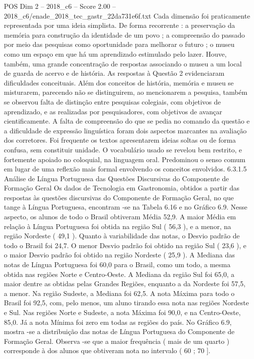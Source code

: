\begin{textsample}{POS Dim 2 – 2018\_c6 – Score 2.00 – 2018\_c6/enade\_2018\_tec\_gastr\_22da731e6f.txt}
Cada dimensão foi praticamente representada por uma ideia simplista.
De forma recorrente : a preservação da memória para construção da identidade de um povo ; a compreensão do passado por meio das pesquisas como oportunidade para melhorar o futuro ; o museu como um espaço em que há um aprendizado estimulado pelo lazer.
Houve, também, uma grande concentração de respostas associando o museu a um local de guarda de acervo e de história.
As respostas à Questão 2 evidenciaram dificuldades conceituais.
Além dos conceitos de história, memória e museu se misturarem, parecendo não se distinguirem, ao mencionarem a pesquisa, também se observou falta de distinção entre pesquisas colegiais, com objetivos de aprendizado, e as realizadas por pesquisadores, com objetivos de avançar cientificamente.
A falta de compreensão do que se pedia no comando da questão e a dificuldade de expressão linguística foram dois aspectos marcantes na avaliação dos corretores.
Foi frequente os textos apresentarem ideias soltas ou de forma confusa, sem constituir unidade.
O vocabulário usado se revelou bem restrito, e fortemente apoiado no coloquial, na linguagem oral.
Predominou o senso comum em lugar de uma reflexão mais formal envolvendo os conceitos envolvidos. 6.3.1.5 Análise de Língua Portuguesa das Questões Discursivas do Componente de Formação Geral Os dados de Tecnologia em Gastronomia, obtidos a partir das respostas às questões discursivas do Componente de Formação Geral, no que tange à Língua Portuguesa, encontram -se na Tabela 6.16 e no Gráfico 6.9.
Nesse aspecto, os alunos de todo o Brasil obtiveram Média 52,9.
A maior Média em relação à Língua Portuguesa foi obtida na região Sul ( 56,3 ), e a menor, na região Nordeste ( 49,1 ).
Quanto à variabilidade das notas, o Desvio padrão de todo o Brasil foi 24,7.
O menor Desvio padrão foi obtido na região Sul ( 23,6 ), e o maior Desvio padrão foi obtido na região Nordeste ( 25,9 ).
A Mediana das notas de Língua Portuguesa foi 60,0 para o Brasil, como um todo, a mesma obtida nas regiões Norte e Centro-Oeste.
A Mediana da região Sul foi 65,0, a maior dentre as obtidas pelas Grandes Regiões, enquanto a da Nordeste foi 57,5, a menor.
Na região Sudeste, a Mediana foi 62,5.
A nota Máxima para todo o Brasil foi 92,5, com, pelo menos, um aluno tirando essa nota nas regiões Nordeste e Sul.
Nas regiões Norte e Sudeste, a nota Máxima foi 90,0, e na Centro-Oeste, 85,0.
Já a nota Mínima foi zero em todas as regiões do país.
No Gráfico 6.9, mostra -se a distribuição das notas de Língua Portuguesa do Componente de Formação Geral.
Observa -se que a maior frequência ( mais de um quarto ) corresponde à dos alunos que obtiveram nota no intervalo ( 60 ; 70 ].

\end{textsample}

